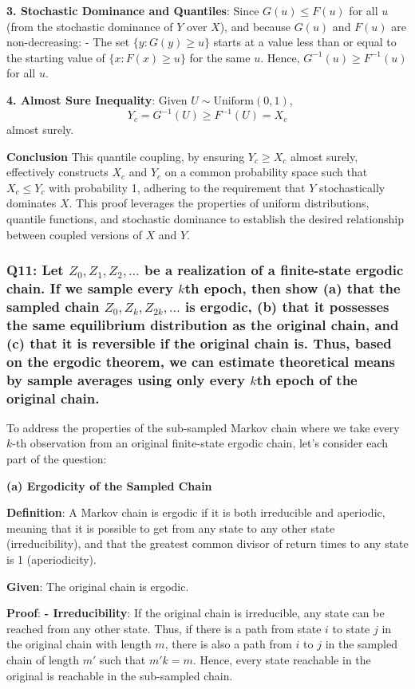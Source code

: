 \documentclass[8pt]{article}
\begin{document}
\textbf{3. Stochastic Dominance and Quantiles}: Since \(G(u) \leq F(u)\) for all \(u\) (from the stochastic dominance of \(Y\) over \(X\)), and because \(G(u)\) and \(F(u)\) are non-decreasing:
   - The set \(\{ y : G(y) \geq u \}\) starts at a value less than or equal to the starting value of \(\{ x : F(x) \geq u \}\) for the same \(u\). Hence, \(G^{-1}(u) \geq F^{-1}(u)\) for all \(u\).

\textbf{4. Almost Sure Inequality}: Given \(U \sim \text{Uniform}(0, 1)\),
   \[
   Y_c = G^{-1}(U) \geq F^{-1}(U) = X_c
   \]
   almost surely.

\textbf{Conclusion}
This quantile coupling, by ensuring \(Y_c \geq X_c\) almost surely, effectively constructs \(X_c\) and \(Y_c\) on a common probability space such that \(X_c \leq Y_c\) with probability 1, adhering to the requirement that \(Y\) stochastically dominates \(X\). This proof leverages the properties of uniform distributions, quantile functions, and stochastic dominance to establish the desired relationship between coupled versions of \(X\) and \(Y\).

\subsubsection*{Q11:
Let \(Z_0, Z_1, Z_2, \ldots\) be a realization of a finite-state ergodic chain. If we sample every \(k\)th epoch, then show (a) that the sampled chain \(Z_0, Z_k, Z_{2k}, \ldots\) is ergodic, (b) that it possesses the same equilibrium distribution as the original chain, and (c) that it is reversible if the original chain is. Thus, based on the ergodic theorem, we can estimate theoretical means by sample averages using only every \(k\)th epoch of the original chain.}

To address the properties of the sub-sampled Markov chain where we take every \(k\)-th observation from an original finite-state ergodic chain, let's consider each part of the question:

\textbf{(a) Ergodicity of the Sampled Chain}

\textbf{Definition}: A Markov chain is ergodic if it is both irreducible and aperiodic, meaning that it is possible to get from any state to any other state (irreducibility), and that the greatest common divisor of return times to any state is 1 (aperiodicity).

\textbf{Given}: The original chain is ergodic.

\textbf{Proof}:
\textbf{- Irreducibility}: If the original chain is irreducible, any state can be reached from any other state. Thus, if there is a path from state \(i\) to state \(j\) in the original chain with length \(m\), there is also a path from \(i\) to \(j\) in the sampled chain of length \(m'\) such that \(m'k = m\). Hence, every state reachable in the original is reachable in the sub-sampled chain.
  
\end{document}
